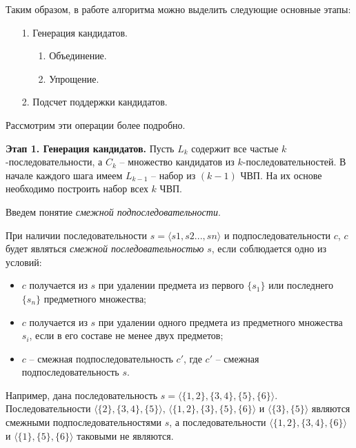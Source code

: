 Таким образом, в работе алгоритма можно выделить следующие основные этапы:


\begin{enumerate}
	\item[1.] Генерация кандидатов.
	\begin{enumerate}
		\item[1.] Объединение.
		\item[2.] Упрощение.
	\end{enumerate}
	\item[2.] Подсчет поддержки кандидатов.
\end{enumerate}

Рассмотрим эти операции более подробно.

\textbf{Этап 1. Генерация кандидатов.} Пусть $L_k$ содержит все частые $k$-последовательности, а $C_k$ – множество кандидатов из $k$-последовательностей. В начале каждого шага имеем $L_{k-1}$ – набор из $(k-1)$ ЧВП. На их основе необходимо построить набор всех $k$ ЧВП.

Введем понятие \textit{смежной подпоследовательности}.

При наличии последовательности $s = \langle s1, s2..., sn \rangle$ и подпоследовательности $c$, $c$ будет являться \textit{смежной последовательностью} $s$, если соблюдается одно из условий:
\begin{itemize}
	\item $c$ получается из $s$ при удалении предмета из первого $\{s_1\}$ или последнего $\{s_n\}$ предметного множества;
	\item $c$ получается из $s$ при удалении одного предмета из предметного множества $s_i$, если в его составе не менее двух предметов;
	\item $c$ – смежная подпоследовательность $c'$, где $c'$ – смежная подпоследовательность $s$.
\end{itemize}

Например, дана последовательность $s = \langle\{1,2\},\{3,4\},\{5\},\{6\}\rangle$. Последовательности $\langle\{2\},\{3,4\},\{5\}\rangle$, $\langle\{1,2\},\{3\},\{5\},\{6\}\rangle$ и $\langle\{3\},\{5\}\rangle$ являются смежными подпоследовательностями $s$, а последовательности $\langle\{1,2\},\{3,4\},\{6\}\rangle$ и $\langle\{1\},\{5\},\{6\}\rangle$ таковыми не являются.

